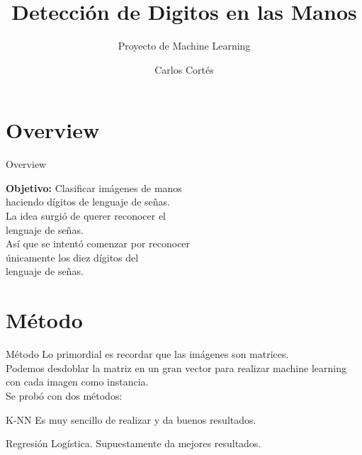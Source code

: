 \documentclass{beamer}
\title{Detección de Digitos en las Manos} %
\subtitle{Proyecto de Machine Learning} %
\author{Carlos Cortés}
\begin{document}
  \frame{\maketitle}

  \begin{darkframes}
    \section{Overview}
    \begin{frame}{Overview}
      \textbf{Objetivo: }Clasificar imágenes de manos\\
      haciendo dígitos de lenguaje de señas.\\ \bigskip \pause
      La idea surgió de querer reconocer el\\
      lenguaje de señas.\\
      Así que se intentó comenzar por reconocer\\
      únicamente los diez dígitos del\\
      lenguaje de señas.\\
      
      
    \end{frame}
    
    \section{Método}
    \begin{frame}{Método}
    Lo primordial es recordar que las imágenes son matrices.\\
    Podemos desdoblar la matriz en un gran vector para realizar machine learning con cada imagen como instancia.\\
    Se probó con dos métodos:
    \pause
    \begin{block}{K-NN}
        Es muy sencillo de realizar y da buenos resultados.\\
    \end{block}
    \pause
    \begin{block}{Regresión Logística.}
        Supuestamente da mejores resultados.
    \end{block}
    \end{frame}


\end{darkframes}
\end{document}
